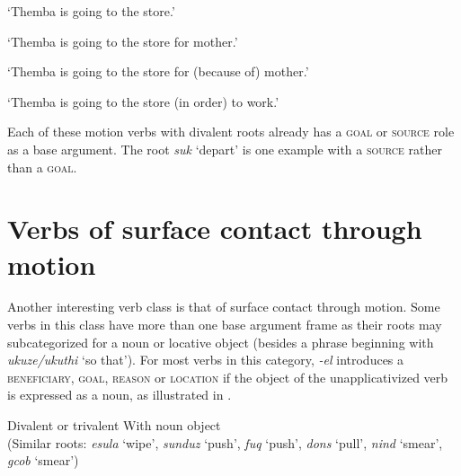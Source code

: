 \documentclass[output=paper]{langsci/langscibook}
\begin{document}
\glt ‘Themba is going to the store.’


\glt ‘Themba is going to the store for mother.’


\glt ‘Themba is going to the store for (because of) mother.’


\glt ‘Themba is going to the store (in order) to work.’
\z
\z


Each of these motion verbs with divalent roots already has a \textsc{goal} or \textsc{source} role as a base argument. The root \textit{suk} ‘depart’ is one example with a \textsc{source} rather than a \textsc{goal}.

\section{Verbs of surface contact through motion}\label{sec:sibanda:}

Another interesting verb class is that of surface contact through motion. Some verbs in this class have more than one base argument frame as their roots may subcategorized for a noun or locative object (besides a phrase beginning with \textit{ukuze/ukuthi} ‘so that’). For most verbs in this category, \textit{-el} introduces a \textsc{beneficiary}, \textsc{goal}, \textsc{reason} or \textsc{location} if the object of the unapplicativized verb is expressed as a noun, as illustrated in . 

\ea\label{ex:sibanda:8}
\settowidth{}
{Divalent or trivalent With noun object}\\
 (Similar roots: \textit{esula} ‘wipe’, \textit{sunduz} ‘push’, \textit{fuq} ‘push’, \textit{dons} ‘pull’, \textit{nind} ‘smear’, \textit{gcob} ‘smear’)\\
\end{document}
